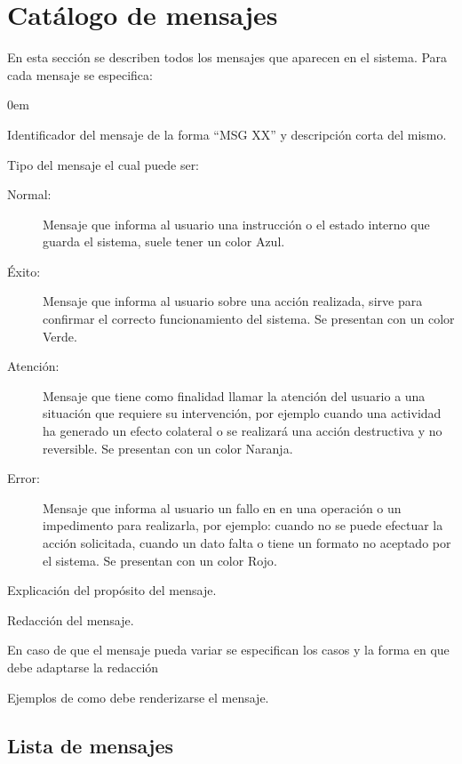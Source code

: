 \section{Catálogo de mensajes}	
\label{sec:mensajes}

	En esta sección se describen todos los mensajes que aparecen en el sistema. Para cada mensaje se especifica:
	 
	\begin{description}\itemsep0em
		\item[Id:] Identificador del mensaje de la forma ``MSG XX'' y descripción corta del mismo.
		\item[Tipo:] Tipo del mensaje el cual puede ser: 
		\begin{description}
			\item[Normal:] Mensaje que informa al usuario una instrucción o el estado interno que guarda el sistema, suele tener un color {\color{msgNormalColor}Azul}.
			\item[Éxito:] Mensaje que informa al usuario sobre una acción realizada, sirve para confirmar el correcto funcionamiento del sistema. Se presentan con un color {\color{msgInfoColor}Verde}.
			\item[Atención:] Mensaje que tiene como finalidad llamar la atención del usuario a una situación que requiere su intervención, por ejemplo cuando una actividad ha generado un efecto colateral o se realizará una acción destructiva y no reversible. Se presentan con un color {\color{msgWarningColor}Naranja}.
			\item[Error:] Mensaje que informa al usuario un fallo en en una operación o un impedimento para realizarla, por ejemplo: cuando no se puede efectuar la acción solicitada, cuando un dato falta o tiene un formato no aceptado por el sistema. Se presentan con un color {\color{msgErrorColor}Rojo}.
		\end{description}
		\item[Propósito:] Explicación del propósito del mensaje.
		\item[Redacción:] Redacción del mensaje.
		\item[Parámetros:] En caso de que el mensaje pueda variar se especifican los casos y la forma en que debe adaptarse la redacción
		\item[Ejemplos:] Ejemplos de como debe renderizarse el mensaje.
	\end{description}


\subsection{Lista de mensajes}

